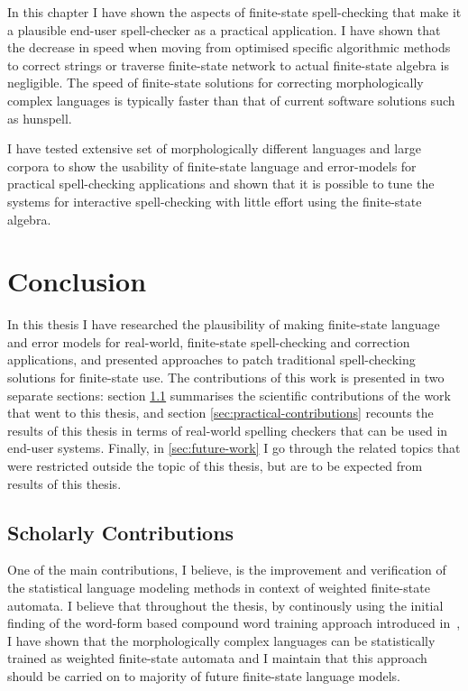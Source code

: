 \documentclass[officiallayout]{unihelcompling}
\begin{document}
In this chapter I have shown the aspects of finite-state spell-checking that
make it a plausible end-user spell-checker as a practical application. I have
shown that the decrease in speed when moving from optimised specific
algorithmic methods to correct strings or traverse finite-state network to
actual finite-state algebra is negligible. The speed of finite-state solutions
for correcting morphologically complex languages is typically faster than
that of current software solutions such as hunspell.

I have tested extensive set of morphologically different languages and
large corpora to show the usability of finite-state language and error-models
for practical spell-checking applications and shown that it is possible to tune
the systems for interactive spell-checking with little effort using the
finite-state algebra.

\chapter{Conclusion}
\label{chap:conclusion}

In this thesis I have researched the plausibility of making finite-state
language and error models for real-world, finite-state spell-checking and
correction applications, and presented approaches to patch traditional
spell-checking solutions for finite-state use. The contributions of this work
is presented in two separate sections: section
\ref{sec:scholarly-contributions} summarises the scientific contributions of
the work that went to this thesis, and section
\ref{sec:practical-contributions} recounts the results of this thesis in terms
of real-world spelling checkers that can be used in end-user systems. Finally,
in \ref{sec:future-work} I go through the related topics that were restricted
outside the topic of this thesis, but are to be expected from results of this
thesis.

\section{Scholarly Contributions}
\label{sec:scholarly-contributions}

One of the main contributions, I believe, is the improvement and verification
of the statistical language modeling methods in context of weighted 
finite-state automata. I believe that throughout the thesis, by continously
using the initial finding of the word-form based compound word training
approach introduced in~, I have shown that the
morphologically complex languages can be statistically trained as weighted
finite-state automata and I maintain that this approach should be carried on
to majority of future finite-state language models.
\end{document}
